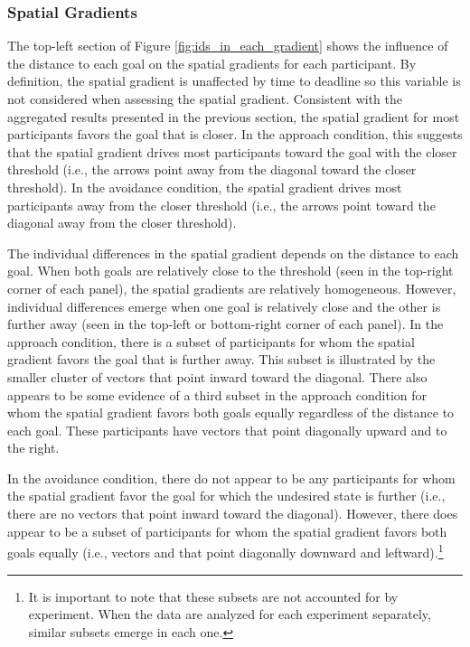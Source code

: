 \documentclass[a4paper,doc,natbib,donotrepeattitle]{apa6}
\begin{document}
\subsubsection{Spatial Gradients}

The top-left section of Figure \ref{fig:ids_in_each_gradient} shows the influence of the distance to each goal on the spatial gradients for each participant. By definition, the spatial gradient is unaffected by time to deadline so this variable is not considered when assessing the spatial gradient. Consistent with the aggregated results presented in the previous section, the spatial gradient for most participants favors the goal that is closer. In the approach condition, this suggests that the spatial gradient drives most participants toward the goal with the closer threshold (i.e., the arrows point away from the diagonal toward the closer threshold). In the avoidance condition, the spatial gradient drives most participants away from the closer threshold (i.e., the arrows point toward the diagonal away from the closer threshold).

The individual differences in the spatial gradient depends on the distance to each goal. When both goals are relatively close to the threshold (seen in the top-right corner of each panel), the spatial gradients are relatively homogeneous. However, individual differences emerge when one goal is relatively close and the other is further away (seen in the top-left or bottom-right corner of each panel). In the approach condition, there is a subset of participants for whom the spatial gradient favors the goal that is further away. This subset is illustrated by the smaller cluster of vectors that point inward toward the diagonal. There also appears to be some evidence of a third subset in the approach condition for whom the spatial gradient favors both goals equally regardless of the distance to each goal. These participants have vectors that point diagonally upward and to the right.

In the avoidance condition, there do not appear to be any participants for whom the spatial gradient favor the goal for which the undesired state is further (i.e., there are no vectors that point inward toward the diagonal). However, there does appear to be a subset of participants for whom the spatial gradient favors both goals equally (i.e., vectors and that point diagonally downward and leftward).\footnote{It is important to note that these subsets are not accounted for by experiment. When the data are analyzed for each experiment separately, similar subsets emerge in each one. }
\end{document}
